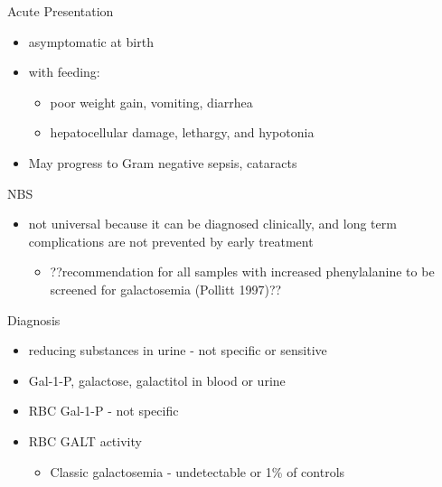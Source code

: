 \documentclass[presentation, smaller]{beamer}
\begin{document}
\begin{frame}[label={sec:orgheadline9}]{Acute Presentation}
\begin{itemize}
\item asymptomatic at birth
\item with feeding:
\begin{itemize}
\item poor weight gain, vomiting, diarrhea
\item hepatocellular damage, lethargy, and hypotonia
\end{itemize}
\item May progress to Gram negative sepsis, cataracts
\end{itemize}
\end{frame}

\begin{frame}[label={sec:orgheadline10}]{NBS}
\begin{itemize}
\item not universal because it can be diagnosed clinically, and long term
complications are not prevented by early treatment
\begin{itemize}
\item ??recommendation for all samples with increased phenylalanine to be
screened for galactosemia (Pollitt 1997)??
\end{itemize}
\end{itemize}
\end{frame}

\begin{frame}[label={sec:orgheadline11}]{Diagnosis}
\begin{itemize}
\item reducing substances in urine - not specific or sensitive
\item Gal-1-P, galactose, galactitol in blood or urine
\item RBC Gal-1-P - not specific
\item RBC GALT activity
\begin{itemize}
\item Classic galactosemia - undetectable or 1\% of controls
\end{itemize}
\end{itemize}
\end{frame}
\end{document}
